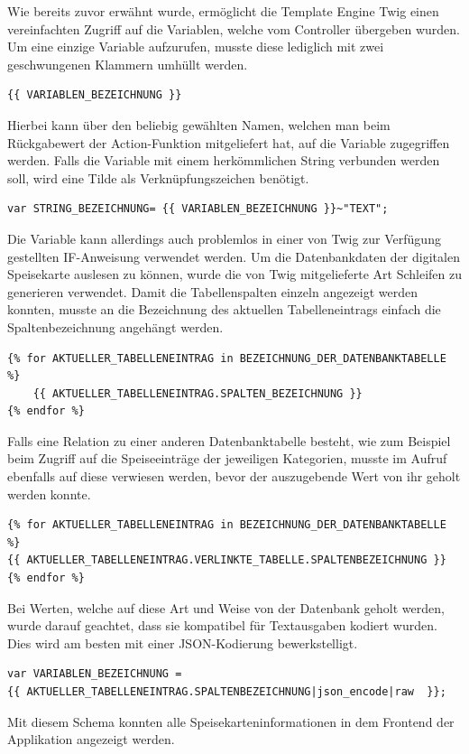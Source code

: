 Wie bereits zuvor erwähnt wurde, ermöglicht die Template Engine Twig einen vereinfachten Zugriff auf die Variablen, welche vom Controller übergeben wurden. Um eine einzige Variable aufzurufen, musste diese lediglich mit zwei geschwungenen Klammern umhüllt werden.
\lstset{language = php}
  	\begin{lstlisting}
{{ VARIABLEN_BEZEICHNUNG }}
\end{lstlisting}
Hierbei kann über den beliebig gewählten Namen, welchen man beim Rückgabewert der Action-Funktion mitgeliefert hat, auf die Variable zugegriffen werden.
Falls die Variable mit einem herkömmlichen String verbunden werden soll, wird eine Tilde als Verknüpfungszeichen benötigt.
\lstset{language = php}
  	\begin{lstlisting}
var STRING_BEZEICHNUNG= {{ VARIABLEN_BEZEICHNUNG }}~"TEXT";
	\end{lstlisting}
Die Variable kann allerdings auch problemlos in einer von Twig zur Verfügung gestellten IF-Anweisung verwendet werden.
Um die Datenbankdaten der digitalen Speisekarte auslesen zu können, wurde die von Twig mitgelieferte Art Schleifen zu generieren verwendet. Damit die Tabellenspalten einzeln angezeigt werden konnten, musste an die Bezeichnung des aktuellen Tabelleneintrags einfach die Spaltenbezeichnung angehängt werden.
\lstset{language = php}
  	\begin{lstlisting}
{% for AKTUELLER_TABELLENEINTRAG in BEZEICHNUNG_DER_DATENBANKTABELLE %}
	{{ AKTUELLER_TABELLENEINTRAG.SPALTEN_BEZEICHNUNG }}
{% endfor %}
	\end{lstlisting}
Falls eine Relation zu einer anderen Datenbanktabelle besteht, wie zum Beispiel beim Zugriff auf die Speiseeinträge der jeweiligen Kategorien, musste im Aufruf ebenfalls auf diese verwiesen werden, bevor der auszugebende Wert von ihr geholt werden konnte.
\lstset{language = php}
  	\begin{lstlisting}
{% for AKTUELLER_TABELLENEINTRAG in BEZEICHNUNG_DER_DATENBANKTABELLE %}
{{ AKTUELLER_TABELLENEINTRAG.VERLINKTE_TABELLE.SPALTENBEZEICHNUNG }}
{% endfor %}
	\end{lstlisting}
Bei Werten, welche auf diese Art und Weise von der Datenbank geholt werden, wurde darauf geachtet, dass sie kompatibel für Textausgaben kodiert wurden. Dies wird am besten mit einer JSON-Kodierung bewerkstelligt.
\lstset{language = php}
  	\begin{lstlisting}
var VARIABLEN_BEZEICHNUNG =
{{ AKTUELLER_TABELLENEINTRAG.SPALTENBEZEICHNUNG|json_encode|raw  }};
	\end{lstlisting}
Mit diesem Schema konnten alle Speisekarteninformationen in dem Frontend der Applikation angezeigt werden.

